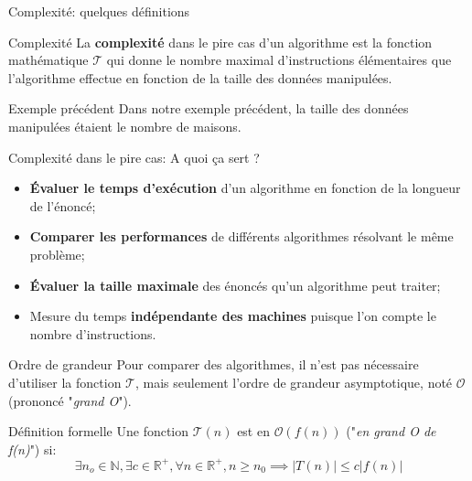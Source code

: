 \documentclass[10pt,xcolor=dvipsnames]{beamer}
\begin{document}
\begin{frame}{Complexité: quelques définitions}

\begin{alertblock}{Complexité}
La \textbf{\alert{complexité}} dans le pire cas d'un algorithme est la fonction mathématique $\mathcal{T}$ qui donne le \alert{nombre maximal d'instructions élémentaires} que l'algorithme effectue en fonction de la taille des données manipulées.\\
\end{alertblock}

\begin{exampleblock}{Exemple précédent}
Dans notre exemple précédent, la taille des données manipulées étaient le nombre de maisons.
\end{exampleblock}
\end{frame}

\begin{frame}{Complexité dans le pire cas: A quoi ça sert ?}
    \begin{itemize}
        \item \alert{\textbf{Évaluer le temps d'exécution}} d'un algorithme en fonction de la longueur de l'énoncé;
        \item \alert{\textbf{Comparer les performances}} de différents algorithmes résolvant le même problème;
        \item \alert{\textbf{Évaluer la taille maximale}} des énoncés qu'un algorithme peut traiter;
        \item Mesure du temps \alert{\textbf{indépendante des machines}} puisque l'on compte le nombre d'instructions.
    \end{itemize}
\end{frame}


\begin{frame}{Ordre de grandeur}
Pour comparer des algorithmes, il n'est pas nécessaire d'utiliser la fonction $\mathcal{T}$, mais seulement l'ordre de grandeur asymptotique, noté $\mathcal{O}$ (prononcé "\textit{grand O}").

\begin{alertblock}{Définition formelle}
Une fonction $\mathcal{T}(n)$ est en $\mathcal{O}(f(n))$ ("\textit{en grand O de f(n)}") si:
\begin{equation*}
    \exists n_o \in \mathbb{N}, \exists c \in \mathbb{R}^+, \forall n \in \mathbb{R}^+, n \geq n_0 \implies | T(n) | \leq c | f(n) | 
\end{equation*}
\end{alertblock}


\end{frame}
\end{document}
